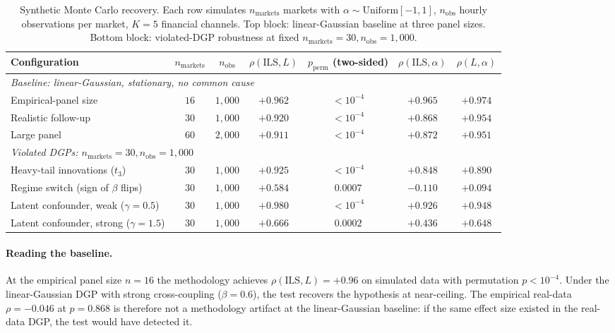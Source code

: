 \documentclass{article}
\begin{document}
\begin{table}[h]
\centering
\caption{Synthetic Monte Carlo recovery. Each row simulates $n_\text{markets}$ markets with $\alpha \sim \text{Uniform}[-1, 1]$, $n_\text{obs}$ hourly observations per market, $K = 5$ financial channels. Top block: linear-Gaussian baseline at three panel sizes. Bottom block: violated-DGP robustness at fixed $n_\text{markets} = 30, n_\text{obs} = 1{,}000$.}
\label{tab:synthetic}
\footnotesize
\begin{tabular}{lcccccc}
\toprule
Configuration & $n_\text{markets}$ & $n_\text{obs}$ & $\rho(\mathrm{ILS}, L)$ & $p_\text{perm}$ (two-sided) & $\rho(\mathrm{ILS}, \alpha)$ & $\rho(L, \alpha)$ \\
\midrule
\multicolumn{7}{l}{\textit{Baseline: linear-Gaussian, stationary, no common cause}} \\
\quad Empirical-panel size  & $16$ & $1{,}000$ & $+0.962$ & $< 10^{-4}$ & $+0.965$ & $+0.974$ \\
\quad Realistic follow-up   & $30$ & $1{,}000$ & $+0.920$ & $< 10^{-4}$ & $+0.868$ & $+0.954$ \\
\quad Large panel           & $60$ & $2{,}000$ & $+0.911$ & $< 10^{-4}$ & $+0.872$ & $+0.951$ \\
\midrule
\multicolumn{7}{l}{\textit{Violated DGPs: $n_\text{markets}=30, n_\text{obs}=1{,}000$}} \\
\quad Heavy-tail innovations ($t_3$)         & $30$ & $1{,}000$ & $+0.925$ & $< 10^{-4}$ & $+0.848$ & $+0.890$ \\
\quad Regime switch (sign of $\beta$ flips)  & $30$ & $1{,}000$ & $+0.584$ & $0.0007$    & $-0.110$ & $+0.094$ \\
\quad Latent confounder, weak ($\gamma=0.5$) & $30$ & $1{,}000$ & $+0.980$ & $< 10^{-4}$ & $+0.926$ & $+0.948$ \\
\quad Latent confounder, strong ($\gamma=1.5$)& $30$ & $1{,}000$ & $+0.666$ & $0.0002$    & $+0.436$ & $+0.648$ \\
\bottomrule
\end{tabular}
\end{table}

\paragraph{Reading the baseline.}
At the empirical panel size $n = 16$ the methodology achieves $\rho(\mathrm{ILS}, L) = +0.96$ on simulated data with permutation $p < 10^{-4}$. Under the linear-Gaussian DGP with strong cross-coupling ($\beta = 0.6$), the test recovers the hypothesis at near-ceiling. The empirical real-data $\rho = -0.046$ at $p = 0.868$ is therefore not a methodology artifact at the linear-Gaussian baseline: if the same effect size existed in the real-data DGP, the test would have detected it.
\end{document}
